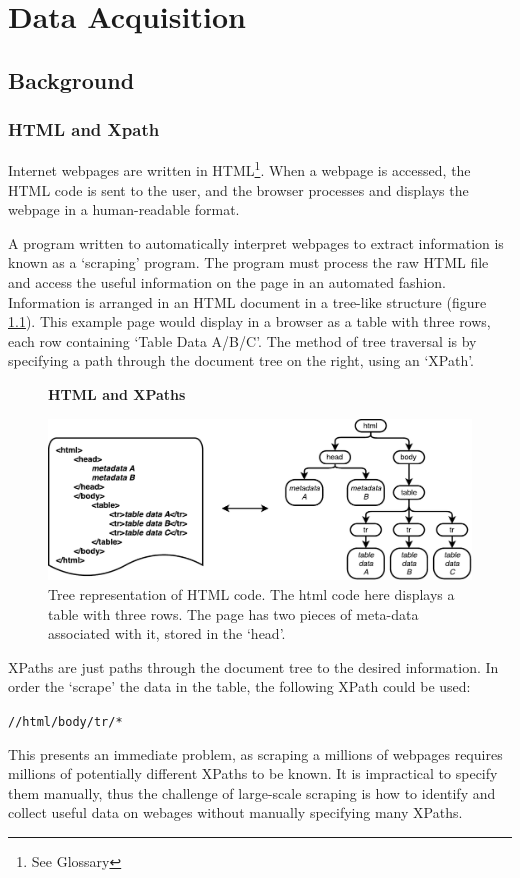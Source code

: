 \chapter{Data Acquisition}
\label{chapt:DATA_ACQUISITION}
\section{Background}
\subsection{HTML and Xpath}

Internet webpages are written in HTML\footnote{See Glossary}. When a webpage is accessed, the HTML code is sent to the user, and the browser processes and displays the webpage in a human-readable format. 

A program written to automatically interpret webpages to extract information is known as a `scraping' program. The program must process the raw HTML file and access the useful information on the page in an automated fashion. Information is arranged in an HTML document in a tree-like structure (figure \ref{fig:HTMLTREE}). This example page would display in a browser as a table with three rows, each row containing `Table Data A/B/C'. The method of tree traversal is by specifying a path through the document tree on the right, using an `XPath'. 
\begin{figure}[H]
    \centering
    \textbf{HTML and XPaths}\par\medskip
    \includegraphics[width=\textwidth]{Data_Acquisition/html_tree.pdf}
    \caption[Tree representation of HTML Code]{Tree representation of HTML code. The html code here displays a table with three rows. The page has two pieces of meta-data associated with it, stored in the `head'.}
\label{fig:HTMLTREE}
\end{figure}
XPaths are just paths through the document tree to the desired information. In order the `scrape' the data in the table, the following XPath could be used:
\begin{center}
\texttt{//html/body/tr/*}
\end{center}
This presents an immediate problem, as scraping a millions of webpages requires millions of potentially different XPaths to be known. It is impractical to specify them manually, thus the challenge of large-scale scraping is how to identify and collect useful data on webages without manually specifying many XPaths.
